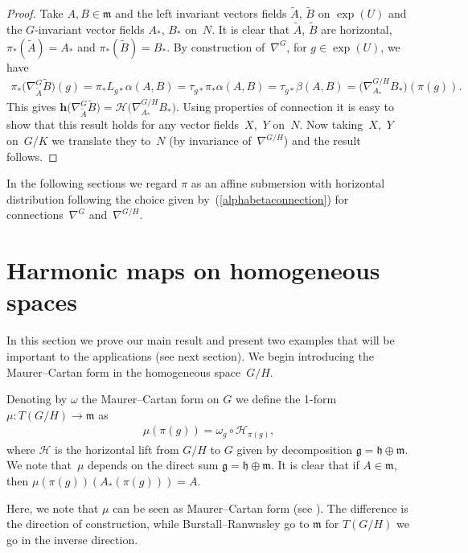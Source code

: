 \documentclass[10pt,a4paper]{amsart}
\numberwithin{equation}{section}
\newcommand{\g}{\mathfrak{g}}
\newcommand{\m}{\mathfrak{m}}
\newcommand{\h}{\mathfrak{h}}
\begin{document}
\begin{proof}
  Take $A, B \in \m$ and the left invariant vectors f\/ields $\tilde{A}$, $\tilde{B}$ on $\exp(U)$ and the $G$-invariant vector f\/ields $A_{*}$, $B_{*}$ on~$N$. It is clear that $\tilde{A}$, $\tilde{B}$ are horizontal, $\pi_{*}(\tilde{A})= A_{*}$ and $\pi_{*}(\tilde{B}) = B_{*}$. By construction of~$\nabla^{G}$, for $g \in \exp(U)$, we have
  \begin{gather*}
    \pi_{*}\big(\nabla^{G}_{\tilde{A}}\tilde{B}\big)(g) = \pi_{*}L_{g*} \alpha(A,B) = \tau_{g*}\pi_{*}\alpha(A,B)
    = \tau_{g*}\beta(A,B) = \big(\nabla^{G/H}_{A_{*}}B_{*}\big)(\pi(g)).
  \end{gather*}
  This gives $\mathbf{h}\big(\nabla^{G}_{\tilde{A}}\tilde{B}\big) = \mathcal{H}\big(\nabla^{G/H}_{A_{*}}B_{*}\big)$. Using properties
  of connection it is easy to show that this result holds for any vector f\/ields~$X$,~$Y$ on~$N$.
  Now taking~$X$,~$Y$ on~$G/K$ we translate they to~$N$ (by invariance of~$\nabla^{G/H}$) and the result follows.
\end{proof}

In the following sections we regard $\pi$ as an af\/f\/ine submersion with horizontal distribution following the choice given by~(\ref{alphabetaconnection}) for connections~$\nabla^{G}$ and~$\nabla^{G/H}$.

\section{Harmonic maps on homogeneous spaces}\label{section3}

In this section we prove our main result and present two examples that will be important to the applications (see next section). We begin introducing the Maurer--Cartan form in the homogeneous space~$G/H$.

Denoting by $\omega$ the Maurer--Cartan form on $G$ we def\/ine the 1-form $\mu\colon T(G/H) \rightarrow \m$ as
\begin{gather*}%
 \mu(\pi(g)) = \omega_{g} \circ \mathcal{H}_{\pi(g)},
\end{gather*}
where $\mathcal{H}$ is the horizontal lift from $G/H$ to $G$ given by decomposition $\g = \h \oplus \m$.  We note that~$\mu$ depends on the direct sum $\g = \h \oplus \m$. It is clear that if $A \in \m$, then $\mu(\pi(g))(A_{*}(\pi(g)))= A$.

\begin{Remark}
  Here, we note that $\mu$  can be  seen as   Maurer--Cartan form (see  \cite[Chapter~1]{BurstallF/RanwnsleyJ}). The dif\/ference is the direction of construction, while Burstall--Ranwnsley go to $\m$ for $T(G/H)$ we go in the inverse direction.
\end{Remark}
\end{document}
